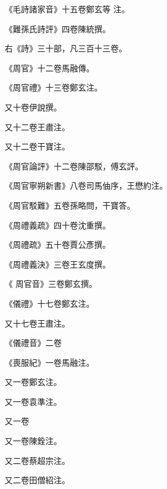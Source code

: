 \begin{pinyinscope}
 《毛詩諸家音》十五卷鄭玄等
 注。



 《難孫氏詩評》四卷陳統撰。



 右《詩》三十部，凡三百十三卷。



 《周官》十二卷馬融傳。



 《周官禮》十三卷鄭玄注。



 又十卷伊說撰。



 又十二卷王肅注。



 又十二卷干寶注。



 《周官論評》十二卷陳邵駁，傅玄評。



 《周官寧朔新書》八卷司馬伷序，王懋約注。



 《周官駁難》五卷孫略問，干寶答。



 《周禮義疏》四十卷沈重撰。



 《周禮疏》五十卷賈公彥撰。



 《周禮義決》三卷王玄度撰。



 《
 周官音》三卷鄭玄撰。



 《儀禮》十七卷鄭玄注。



 又十七卷王肅注。



 《儀禮音》二卷



 《喪服紀》一卷馬融注。



 又一卷鄭玄注。



 又一卷袁準注。



 又一卷



 又一卷陳銓注。



 又二卷蔡超宗注。



 又二卷田僧紹注。




\end{pinyinscope}
